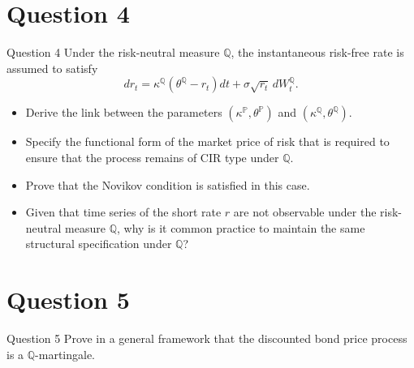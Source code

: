 \documentclass[compress]{beamer}
\begin{document}

\section{Question 4}

\begin{frame}[allowframebreaks]{Question 4}
    Under the risk-neutral measure $\mathbb{Q}$, the instantaneous risk-free rate is assumed to satisfy
    \[
        dr_t = \kappa^{\mathbb{Q}}\left(\theta^{\mathbb{Q}} - r_t\right)dt + \sigma\sqrt{r_t}\,dW_t^{\mathbb{Q}}.
    \]
    \begin{itemize}
        \item[(i)] Derive the link between the parameters $(\kappa^{\mathbb{P}}, \theta^{\mathbb{P}})$ and $(\kappa^{\mathbb{Q}}, \theta^{\mathbb{Q}})$.
        \item[(ii)] Specify the functional form of the market price of risk that is required to ensure that the process remains of CIR type under $\mathbb{Q}$.
        \item[(iii)] Prove that the Novikov condition is satisfied in this case.
        \item[(iv)] Given that time series of the short rate $r$ are not observable under the risk-neutral measure $\mathbb{Q}$, why is it common practice to maintain the same structural specification under $\mathbb{Q}$?
    \end{itemize}
\end{frame}


\section{Question 5}

\begin{frame}{Question 5}
    Prove in a general framework that the discounted bond price process is a $\mathbb{Q}$-martingale.
\end{frame}
\end{document}
